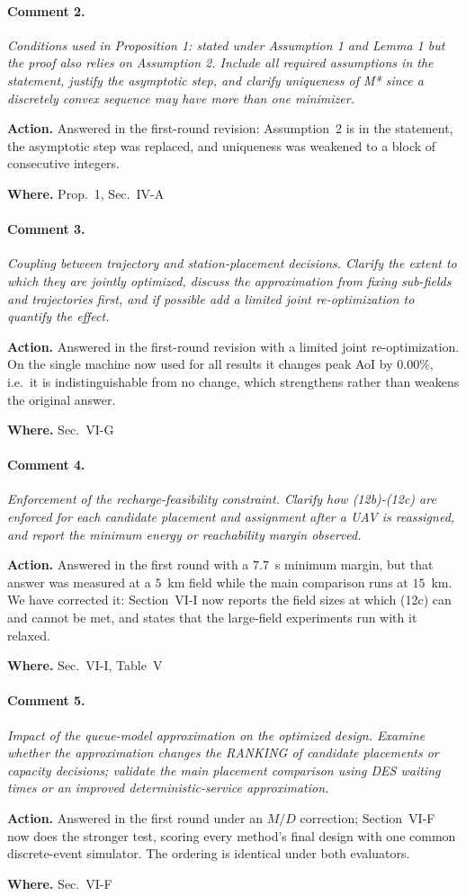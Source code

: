 \documentclass[10pt]{article}
\newcommand{\rev}[1]{\par\medskip\noindent\textit{#1}\par\smallskip}
\newcommand{\act}[2]{\noindent\textbf{Action.} #1\par\noindent\textbf{Where.} #2\par}
\begin{document}
\paragraph{Comment 2.}
\rev{Conditions used in Proposition 1: stated under Assumption 1 and Lemma 1 but the proof also relies on Assumption 2. Include all required assumptions in the statement, justify the asymptotic step, and clarify uniqueness of M* since a discretely convex sequence may have more than one minimizer.}
\act{Answered in the first-round revision: Assumption~2 is in the statement, the asymptotic step was replaced, and uniqueness was weakened to a block of consecutive integers.}{Prop.~1, Sec.~IV-A}

\paragraph{Comment 3.}
\rev{Coupling between trajectory and station-placement decisions. Clarify the extent to which they are jointly optimized, discuss the approximation from fixing sub-fields and trajectories first, and if possible add a limited joint re-optimization to quantify the effect.}
\act{Answered in the first-round revision with a limited joint re-optimization. On the single machine now used for all results it changes peak AoI by $0.00\%$, i.e.\ it is indistinguishable from no change, which strengthens rather than weakens the original answer.}{Sec.~VI-G}

\paragraph{Comment 4.}
\rev{Enforcement of the recharge-feasibility constraint. Clarify how (12b)-(12c) are enforced for each candidate placement and assignment after a UAV is reassigned, and report the minimum energy or reachability margin observed.}
\act{Answered in the first round with a $7.7$~s minimum margin, but that answer was measured at a $5$~km field while the main comparison runs at $15$~km. We have corrected it: Section~VI-I now reports the field sizes at which (12c) can and cannot be met, and states that the large-field experiments run with it relaxed.}{Sec.~VI-I, Table~V}

\paragraph{Comment 5.}
\rev{Impact of the queue-model approximation on the optimized design. Examine whether the approximation changes the RANKING of candidate placements or capacity decisions; validate the main placement comparison using DES waiting times or an improved deterministic-service approximation.}
\act{Answered in the first round under an $M/D$ correction; Section~VI-F now does the stronger test, scoring every method's final design with one common discrete-event simulator. The ordering is identical under both evaluators.}{Sec.~VI-F}
\end{document}
